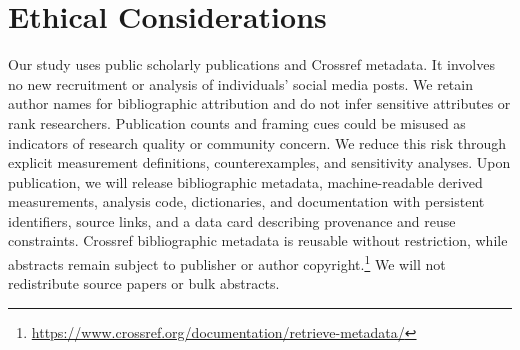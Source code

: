 \section*{Ethical Considerations}
Our study uses public scholarly publications and Crossref metadata. It involves no new recruitment or analysis of individuals' social media posts. We retain author names for bibliographic attribution and do not infer sensitive attributes or rank researchers. Publication counts and framing cues could be misused as indicators of research quality or community concern. We reduce this risk through explicit measurement definitions, counterexamples, and sensitivity analyses. Upon publication, we will release bibliographic metadata, machine-readable derived measurements, analysis code, dictionaries, and documentation with persistent identifiers, source links, and a data card describing provenance and reuse constraints. Crossref bibliographic metadata is reusable without restriction, while abstracts remain subject to publisher or author copyright.\footnote{\url{https://www.crossref.org/documentation/retrieve-metadata/}} We will not redistribute source papers or bulk abstracts.
